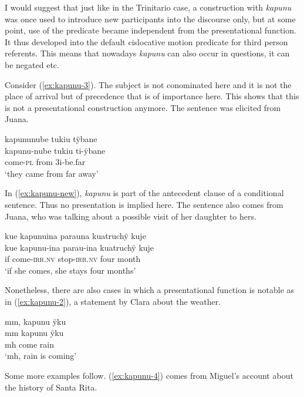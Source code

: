 I would suggest that just like in the Trinitario case, a construction with \textit{kapunu} was once used to introduce new participants into the discourse only, but at some point, use of the predicate became independent from the presentational function. It thus developed into the default cislocative motion predicate for third person referents. This means that nowadays \textit{kapunu} can also occur in questions, it can be negated etc.

Consider (\ref{ex:kapunu-3}). The subject is not conominated here and it is not the place of arrival but of precedence that is of importance here. This shows that this is not a presentational construction anymore. The sentence was elicited from Juana.

\ea\label{ex:kapunu-3}
\begingl 
\glpreamble kapununube tukiu tÿbane\\
\gla kapunu-nube tukiu ti-ÿbane\\ 
\glb come-\textsc{pl} from 3i-be.far\\ 
\glft ‘they came from far away’\\ 
\endgl
\trailingcitation{[jmx-e090727s.320]}
\xe

In (\ref{ex:kapunu-new}), \textit{kapunu} is part of the antecedent clause of a conditional sentence. Thus no presentation is implied here. The sentence also comes from Juana, who was talking about a possible visit of her daughter to hers.

\ea\label{ex:kapunu-new}
\begingl
\glpreamble kue kapunuina parauna kuatruchÿ kuje\\
\gla kue kapunu-ina parau-ina kuatruchÿ kuje\\
\glb if come-\textsc{irr.nv} stop-\textsc{irr.nv} four month\\
\glft ‘if she comes, she stays four months’
\endgl
\trailingcitation{[jxx-p110923l-1.425]}
\xe

Nonetheless, there are also cases in which a presentational function is notable as in (\ref{ex:kapunu-2}), a statement by Clara about the weather.

\ea\label{ex:kapunu-2}
\begingl 
\glpreamble mm, kapunu ÿku\\
\gla mm kapunu ÿku\\ 
\glb mh come rain\\ 
\glft ‘mh, rain is coming’\\ 
\endgl
\trailingcitation{[cux-120410ls.257]}
\xe

 
Some more examples follow. (\ref{ex:kapunu-4}) comes from Miguel’s account about the history of Santa Rita.

